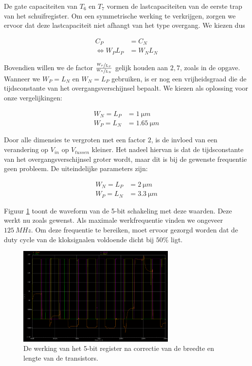 \documentclass[11pt,a4paper,oneside,dutch]{article}
\begin{document}
De gate capaciteiten van $T_6$ en $T_7$ vormen de lastcapaciteiten van de eerste trap van het schuifregister. Om een symmetrische werking te verkrijgen, zorgen we ervoor dat deze lastcapaciteit niet afhangt van het type overgang. We kiezen dus

\begin{align*}
C_P &= C_N \\
\Leftrightarrow W_P L_P &= W_N L_N
\end{align*}

Bovendien willen we de factor $\frac{\sfrac{W_P}{L_P}}{\sfrac{W_N}{L_N}}$ gelijk houden aan $2,7$, zoals in de opgave. Wanneer we $W_P = L_N$ en $W_N = L_P$ gebruiken, is er nog een vrijheidsgraad die de tijdsconstante van het overgangsverschijnsel bepaalt. We kiezen als oplossing voor onze vergelijkingen:

\begin{align*}
W_N = L_P &= \SI{1}{\micro m} \\
W_P = L_N &= \SI{1,65}{\micro m}
\end{align*}

Door alle dimensies te vergroten met een factor $2$, is de invloed van een verandering op $V_{in}$ op $V_{tussen}$ kleiner. Het nadeel hiervan is dat de tijdsconstante van het overgangsverschijnsel groter wordt, maar dit is bij de gewenste frequentie geen probleem. De uiteindelijke parameters zijn:

\begin{align*}
W_N = L_P &= \SI{2}{\micro m} \\
W_P = L_N &= \SI{3,3}{\micro m}
\end{align*}

Figuur \ref{fig:wave_optimaal} toont de waveform van de 5-bit schakeling met deze waarden. Deze werkt nu zoals gewenst. Als maximale werkfrequentie vinden we ongeveer $\SI{125}{MHz}$. Om deze frequentie te bereiken, moet ervoor gezorgd worden dat de duty cycle van de kloksignalen voldoende dicht bij $50\%$ ligt.

\begin{figure}[htp]
	\centering
	\includegraphics[width=0.7\textwidth]{wave_optimaal.png}
	\caption{De werking van het 5-bit register na correctie van de breedte en lengte van de transistors.}
	\label{fig:wave_optimaal}
\end{figure}
\end{document}
